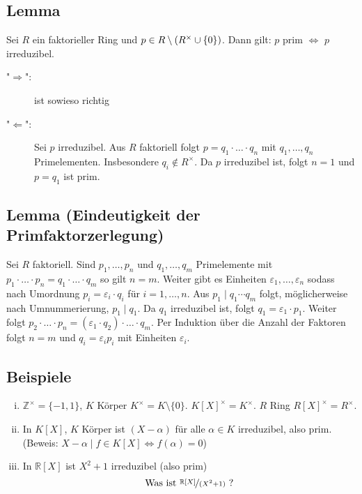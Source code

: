 \subsection[Lemma: In faktoriellen Ringen ist prim äquivalent zu irreduzibel]{Lemma} %
\label{sub:710}
Sei $R$ ein faktorieller Ring und $p \in R\setminus \enbrace{R^\times \cup \{0\}} $. Dann gilt: $p$ prim $\iff$ $p$ irreduzibel.
\begin{description}
	\item["$\Rightarrow $":] ist sowieso richtig
	\item["$\Leftarrow$":] Sei $p$ irreduzibel. Aus $R$ faktoriell folgt $p = q_1 \cdot \ldots \cdot q_n$ mit $q_1, \ldots , q_n$ Primelementen. Insbesondere 
	$q_i \not\in R^\times$. Da $p$ irreduzibel ist, folgt $n=1$ und $p= q_1$ ist prim. \bewende
\end{description}

\subsection{Lemma (Eindeutigkeit der Primfaktorzerlegung)} %
\label{sub:711}
Sei $R$ faktoriell. Sind $p_1, \ldots , p_n$ und $q_1, \ldots , q_m$ Primelemente mit $p_1 \cdot \ldots \cdot p_n = q_1 \cdot \ldots \cdot q_m$ so gilt $n=m$. Weiter gibt es Einheiten $\varepsilon_1, \ldots ,\varepsilon_n$ sodass nach Umordnung $p_i = \varepsilon_i \cdot q_i$ für $i=1,\ldots ,n$.
Aus $p_1 \mid q_1 \cdots q_m$ folgt, möglicherweise nach Umnummerierung, $p_1 \mid q_1$. Da $q_1$ irreduzibel ist, folgt $q_1 = \varepsilon_1 \cdot p_1$. Weiter folgt
$p_2 \cdot \ldots \cdot p_n = (\varepsilon_1 \cdot q_2) \cdot \ldots \cdot q_m$. Per Induktion über die Anzahl der Faktoren folgt $n= m$ und $q_i =  \varepsilon_i p_i$
mit Einheiten $\varepsilon_i$. \bewende

\subsection[Beispiele: Einheitengruppen, irreduzible Elemente]{Beispiele} %
\label{sub:712}
\begin{enumerate}[(i)]
	\item $\mathds{Z}^\times = \{-1,1\}$, $K$ Körper $K^\times = K \setminus \{0\}$.
	$K[X]^\times = K^\times$. $R$ Ring $R[X]^\times = R^\times$.
	\item In $K[X]$, $K$ Körper ist $(X- \alpha)$ für alle $\alpha \in K$ irreduzibel, also prim. \\
	(Beweis: $X- \alpha \mid f \in K[X] \iff f(\alpha)=0$)
	\item In $\mathds{R}[X]$ ist $X^2+1$ irreduzibel (also prim)
	\[
		\text{Was ist }\nicefrac{\mathds{R}[X]}{(X^2+1)} \text{ ?}
	\]
\end{enumerate}

